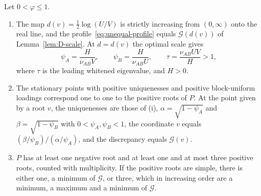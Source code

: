 \begin{applemma}
\label{lem:D-roots}
Let $0<\varphi\le1$.
\begin{enumerate}
\item[(i)] The map $d(v)=\tfrac12\log(U/V)$ is strictly increasing from $(0,\infty)$ onto the real line, and the profile~\eqref{eq:unequal-profile} equals $\mathcal G(d(v))$ of Lemma~\ref{lem:D-scale}. At $d=d(v)$ the optimal scale gives
\[
\psi_A=\frac{H}{\nu_{AB}V},\qquad \psi_B=\frac{H}{\nu_{AB}U},
\qquad \tau=\frac{\nu_{AB}UV}{H}>1,
\]
where $\tau$ is the leading whitened eigenvalue, and $H>0$.
\item[(ii)] The stationary points with positive uniquenesses and positive block-uniform loadings correspond one to one to the positive roots of $P$. At the point given by a root $v$, the uniquenesses are those of (i), $\alpha=\sqrt{1-\psi_A}$ and $\beta=\sqrt{1-\psi_B}$ with $0<\psi_A,\psi_B<1$, the coordinate $v$ equals $(\beta/\psi_B)/(\alpha/\psi_A)$, and the discrepancy equals $\mathcal G(v)$.
\item[(iii)] $P$ has at least one negative root and at least one and at most three positive roots, counted with multiplicity. If the positive roots are simple, there is either one, a minimum of $\mathcal G$, or three, which in increasing order are a minimum, a maximum and a minimum of $\mathcal G$.
\end{enumerate}
\end{applemma}


